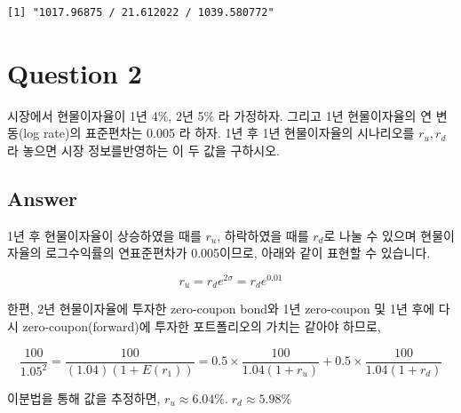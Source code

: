 \documentclass[
  a4paper,
  DIV=11,
  numbers=noendperiod]{scrreprt}
\begin{document}
\begin{verbatim}
[1] "1017.96875 / 21.612022 / 1039.580772"
\end{verbatim}

\section*{Question 2}\label{question-2}


시장에서 현물이자율이 1년 4\%, 2년 5\% 라 가정하자. 그리고 1년
현물이자율의 연 변동(log rate)의 표준편차는 0.005 라 하자. 1년 후 1년
현물이자율의 시나리오를 \(r_u, r_d\) 라 놓으면 시장 정보를반영하는 이 두
값을 구하시오.

\subsection*{Answer}\label{answer-1}

1년 후 현물이자율이 상승하였을 때를 \(r_u\), 하락하였을 때를 \(r_d\)로
나눌 수 있으며 현물이자율의 로그수익률의 연표준편차가 0.005이므로,
아래와 같이 표현할 수 있습니다.

\[r_u=r_de^{2\sigma}=r_de^{0.01}\]

한편, 2년 현물이자율에 투자한 zero-coupon bond와 1년 zero-coupon 및 1년
후에 다시 zero-coupon(forward)에 투자한 포트폴리오의 가치는 같아야
하므로,

\[\frac{100}{1.05^2}=\frac{100}{(1.04)(1+E(r_1))}=0.5\times \frac{100}{1.04(1+r_u)}+0.5\times \frac{100}{1.04(1+r_d)}\]

이분법을 통해 값을 추정하면, \(r_u\approx 6.04\%.\;r_d\approx 5.98\%\)
\end{document}
